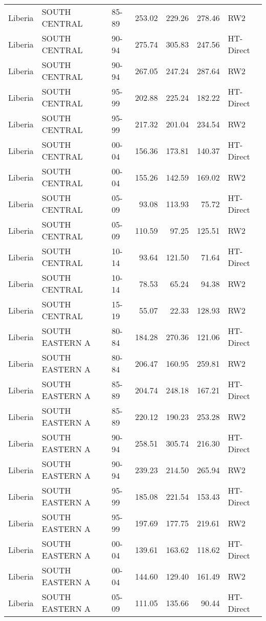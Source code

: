 \begin{longtable}{lllrrrl}
  Liberia & SOUTH CENTRAL & 85-89 & 253.02 & 229.26 & 278.46 & RW2 \\ 
  Liberia & SOUTH CENTRAL & 90-94 & 275.74 & 305.83 & 247.56 & HT-Direct \\ 
  Liberia & SOUTH CENTRAL & 90-94 & 267.05 & 247.24 & 287.64 & RW2 \\ 
  Liberia & SOUTH CENTRAL & 95-99 & 202.88 & 225.24 & 182.22 & HT-Direct \\ 
  Liberia & SOUTH CENTRAL & 95-99 & 217.32 & 201.04 & 234.54 & RW2 \\ 
  Liberia & SOUTH CENTRAL & 00-04 & 156.36 & 173.81 & 140.37 & HT-Direct \\ 
  Liberia & SOUTH CENTRAL & 00-04 & 155.26 & 142.59 & 169.02 & RW2 \\ 
  Liberia & SOUTH CENTRAL & 05-09 & 93.08 & 113.93 & 75.72 & HT-Direct \\ 
  Liberia & SOUTH CENTRAL & 05-09 & 110.59 & 97.25 & 125.51 & RW2 \\ 
  Liberia & SOUTH CENTRAL & 10-14 & 93.64 & 121.50 & 71.64 & HT-Direct \\ 
  Liberia & SOUTH CENTRAL & 10-14 & 78.53 & 65.24 & 94.38 & RW2 \\ 
  Liberia & SOUTH CENTRAL & 15-19 & 55.07 & 22.33 & 128.93 & RW2 \\ 
  Liberia & SOUTH EASTERN A & 80-84 & 184.28 & 270.36 & 121.06 & HT-Direct \\ 
  Liberia & SOUTH EASTERN A & 80-84 & 206.47 & 160.95 & 259.81 & RW2 \\ 
  Liberia & SOUTH EASTERN A & 85-89 & 204.74 & 248.18 & 167.21 & HT-Direct \\ 
  Liberia & SOUTH EASTERN A & 85-89 & 220.12 & 190.23 & 253.28 & RW2 \\ 
  Liberia & SOUTH EASTERN A & 90-94 & 258.51 & 305.74 & 216.30 & HT-Direct \\ 
  Liberia & SOUTH EASTERN A & 90-94 & 239.23 & 214.50 & 265.94 & RW2 \\ 
  Liberia & SOUTH EASTERN A & 95-99 & 185.08 & 221.54 & 153.43 & HT-Direct \\ 
  Liberia & SOUTH EASTERN A & 95-99 & 197.69 & 177.75 & 219.61 & RW2 \\ 
  Liberia & SOUTH EASTERN A & 00-04 & 139.61 & 163.62 & 118.62 & HT-Direct \\ 
  Liberia & SOUTH EASTERN A & 00-04 & 144.60 & 129.40 & 161.49 & RW2 \\ 
  Liberia & SOUTH EASTERN A & 05-09 & 111.05 & 135.66 & 90.44 & HT-Direct \\ 

\end{longtable}
